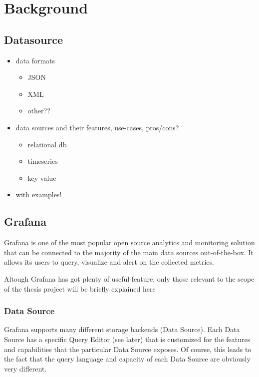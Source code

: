 \chapter{Background}

\section{Datasource}

\begin{itemize}
	\item data formats
	\begin{itemize}
		\item JSON
		\item XML
		\item other??
	\end{itemize}
	\item data sources and their features, use-cases, pros/cons?
	\begin{itemize}
		\item relational db
		\item timeseries
		\item key-value
	\end{itemize}
	\item with examples!
\end{itemize}


\section{Grafana}

Grafana is one of the most popular open source analytics and monitoring solution that can be connected to the majority of the main data sources out-of-the-box. It allows its users to query, visualize and alert on the collected metrics. 

Altough Grafana has got plenty of useful feature, only those relevant to the scope of the thesis project will be briefly explained here


\subsection{Data Source}

Grafana supports many different storage backends (Data Source). Each Data Source has a specific Query Editor (see later) that is customized for the features and capabilities that the particular Data Source exposes. Of course, this leads to the fact that the query language and capacity of each Data Source are obviously very different.

